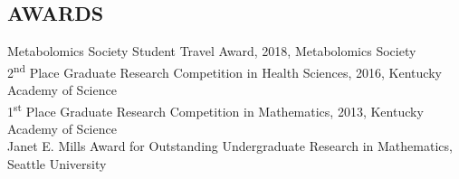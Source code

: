 \begin{DoubleSpace*}
{\section*{AWARDS}
Metabolomics Society Student Travel Award, 2018, Metabolomics Society\\

2\textsuperscript{nd} Place Graduate Research Competition in Health Sciences, 2016, Kentucky Academy of Science\\

1\textsuperscript{st} Place Graduate Research Competition in Mathematics, 2013, Kentucky Academy of Science\\

Janet E. Mills Award for Outstanding Undergraduate Research in Mathematics, Seattle University
}
\end{DoubleSpace*}